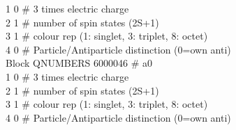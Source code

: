 {        1 0  \# 3 times electric charge\\
        2 1  \# number of spin states (2S+1)\\
        3 1  \# colour rep (1: singlet, 3: triplet, 8: octet)\\
        4 0  \# Particle/Antiparticle distinction (0=own anti)\\
Block QNUMBERS 6000046  \# a0 \\
        1 0  \# 3 times electric charge\\
        2 1  \# number of spin states (2S+1)\\
        3 1  \# colour rep (1: singlet, 3: triplet, 8: octet)\\
        4 0  \# Particle/Antiparticle distinction (0=own anti)\\
 }

\label{app1}


\clearpage{\pagestyle{empty}\cleardoublepage}
